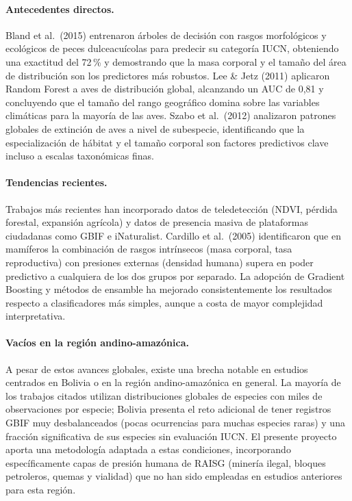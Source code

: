 \documentclass[12pt,a4paper]{article}
\begin{document}
\paragraph{Antecedentes directos.}
Bland et al.\ (2015) \cite{bland2015} entrenaron árboles de decisión con rasgos morfológicos
y ecológicos de peces dulceacuícolas para predecir su categoría IUCN, obteniendo una exactitud
del 72\,\% y demostrando que la masa corporal y el tamaño del área de distribución son los
predictores más robustos.
Lee \& Jetz (2011) \cite{lee2017} aplicaron Random Forest a aves de distribución global,
alcanzando un AUC de 0,81 y concluyendo que el tamaño del rango geográfico domina sobre
las variables climáticas para la mayoría de las aves.
Szabo et al.\ (2012) \cite{szabo2012} analizaron patrones globales de extinción de aves
a nivel de subespecie, identificando que la especialización de hábitat y el tamaño corporal
son factores predictivos clave incluso a escalas taxonómicas finas.

\paragraph{Tendencias recientes.}
Trabajos más recientes han incorporado datos de teledetección (NDVI, pérdida forestal,
expansión agrícola) y datos de presencia masiva de plataformas ciudadanas como GBIF e iNaturalist.
Cardillo et al.\ (2005) \cite{cardillo2004} identificaron que en mamíferos la combinación
de rasgos intrínsecos (masa corporal, tasa reproductiva) con presiones externas (densidad
humana) supera en poder predictivo a cualquiera de los dos grupos por separado.
La adopción de Gradient Boosting y métodos de ensamble ha mejorado consistentemente los
resultados respecto a clasificadores más simples, aunque a costa de mayor complejidad interpretativa.

\paragraph{Vacíos en la región andino-amazónica.}
A pesar de estos avances globales, existe una brecha notable en estudios centrados en
Bolivia o en la región andino-amazónica en general.
La mayoría de los trabajos citados utilizan distribuciones globales de especies con miles
de observaciones por especie; Bolivia presenta el reto adicional de tener registros GBIF
muy desbalanceados (pocas ocurrencias para muchas especies raras) y una fracción significativa
de sus especies sin evaluación IUCN.
El presente proyecto aporta una metodología adaptada a estas condiciones, incorporando
específicamente capas de presión humana de RAISG (minería ilegal, bloques petroleros, quemas
y vialidad) que no han sido empleadas en estudios anteriores para esta región.
\end{document}
